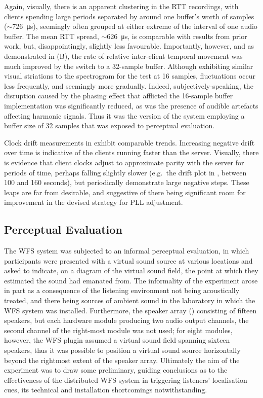 Again, visually, there is an apparent clustering in the RTT recordings, with
clients spending large periods separated by around one buffer's worth of
samples ($\sim$\qty{726}{\us}), seemingly often grouped at either
extreme of the interval of one audio buffer.
The mean RTT spread, $\sim$\qty{626}{\us}, is comparable with results
from prior work, but, disappointingly, slightly less favourable.
Importantly, however, and as demonstrated in (B), the
rate of relative inter-client temporal movement was much improved by the switch
to a 32-sample buffer.
Although exhibiting similar visual striations to the spectrogram for the test
at 16 samples, fluctuations occur less frequently, and seemingly more
gradually.
Indeed, subjectively-speaking, the disruption caused by the phasing effect
that afflicted the 16-sample buffer implementation was significantly reduced,
as was the presence of audible artefacts affecting harmonic signals.
Thus it was the version of the system employing a buffer size of 32 samples
that was exposed to perceptual evaluation.

Clock drift measurements in  exhibit
comparable trends.
Increasing negative drift over time is indicative of the clients running faster
than the server.
Visually, there is evidence that client clocks adjust to approximate parity
with the server for periods of time, perhaps falling slightly slower (e.g.\
the drift plot in , between 100 and 160 seconds), but
periodically demonstrate large negative steps.
These leaps are far from desirable, and suggestive of there being significant
room for improvement in the devised strategy for PLL adjustment.


\subsection{Perceptual Evaluation}\label{subsec:perceptual-evaluation}

The WFS system was subjected to an informal perceptual evaluation, in which
participants were presented with a virtual sound source at various locations
and asked to indicate, on a diagram of the virtual sound field, the point
at which they estimated the sound had emanated from.
The informality of the experiment arose in part as a consequence of the
listening environment not being acoustically treated, and there being sources
of ambient sound in the laboratory in which the WFS system was installed.
Furthermore, the speaker array (\figref{fig:eval-setup}) consisting of fifteen
speakers, but each hardware module producing two audio output channels,
the second channel of the right-most module was not used;
for eight modules, however, the WFS plugin assumed a virtual sound field
spanning sixteen speakers, thus it was possible to position a virtual sound
source horizontally beyond the rightmost extent of the speaker array.
Ultimately the aim of the experiment was to draw some preliminary, guiding
conclusions as to the effectiveness of the distributed WFS system in
triggering listeners' localisation cues, its technical and installation
shortcomings notwithstanding.

